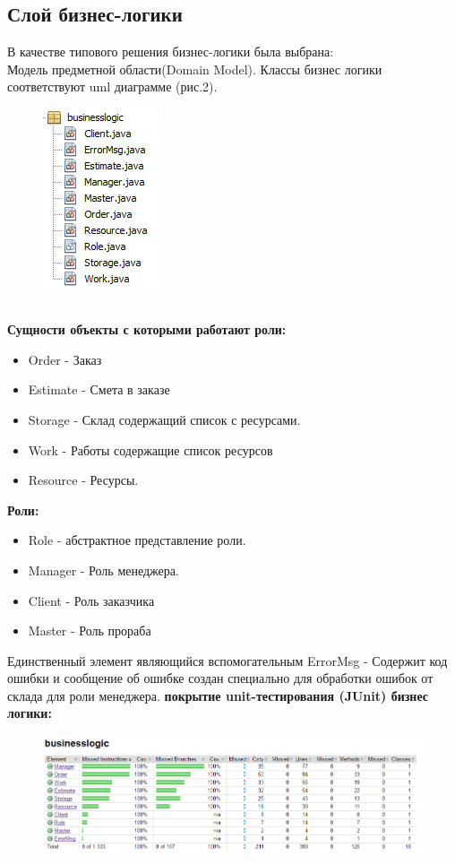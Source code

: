 \documentclass[12pt,a4paper,titlepage]{article}
\begin{document}
\subsection{Слой бизнес-логики}
В качестве типового решения бизнес-логики была выбрана: 
\\
Модель предметной области(Domain Model).
Классы бизнес логики соответствуют uml диаграмме (рис.2).
\begin{figure}[!ht]
\includegraphics[scale=0.8]{images/bisnesslogic.png}\caption{}
\end{figure}
\\
\textbf{Сущности объекты с которыми работают роли:}
\begin{itemize}
\item Order - Заказ
\item Estimate - Смета в заказе
\item Storage - Склад содержащий список с ресурсами.
\item Work - Работы содержащие список ресурсов
\item Resource - Ресурсы.
\end{itemize}

\textbf{Роли:}
\begin{itemize}
\item Role - абстрактное представление роли.
\item Manager - Роль менеджера.
\item Client - Роль заказчика
\item Master - Роль прораба
\end{itemize}
Единственный элемент являющийся вспомогательным
ErrorMsg - Содержит код ошибки и сообщение об ошибке
создан специально для обработки ошибок от склада для роли менеджера.
\newpage
\textbf{покрытие unit-тестирования (JUnit) бизнес логики:}
\begin{figure}[!ht]
\includegraphics[scale=0.6]{images/busnesslogicJUintTest.png}\caption{}
\end{figure}
\newpage
\end{document}
